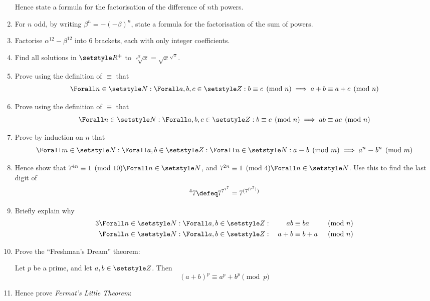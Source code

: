 \begin{enumerate}
  Hence state a formula for the factorisation of the difference of \(n\)th
  powers.
 \item
  For \(n\) odd, by writing \(\beta^n = -(-\beta)^n\), state a formula for the
  factorisation of the sum of powers.
 \item
  Factorise \(\alpha^{12} - \beta^{12}\) into 6 brackets, each with only integer
  coefficients.
 \item
  Find all solutions in \(\Reals^+\) to
  \(\sqrt[\sqrt x]x = {\sqrt x}^{\sqrt x}\).
 \item
  Prove using the definition of \(\equiv\) that
  \begin{equation*}
   \Forall n \in \Naturals :
   \Forall a, b, c \in \Integers :
   b \equiv c \pmod n \implies
   a + b \equiv a + c \pmod n
  \end{equation*}
 \item
  Prove using the definition of \(\equiv\) that
  \begin{equation*}
   \Forall n \in \Naturals :
   \Forall a, b, c \in \Integers :
   b \equiv c \pmod n \implies
   ab \equiv ac \pmod n
  \end{equation*}
 \item
  Prove by induction on \(n\) that
  \begin{equation*}
    \Forall m \in \Naturals :
    \Forall a, b \in \Integers :
    \Forall n \in \Naturals :
    a \equiv b \pmod m \implies
    a^n \equiv b^n \pmod m
  \end{equation*}
 \item
  Hence show that \(7^{4n} \equiv 1 \pmod{10} \Forall n \in \Naturals\), and
  \(7^{2n} \equiv 1 \pmod 4 \Forall n \in \Naturals\). Use
  this to find the last digit of
  \begin{equation*}
   {}^4 7 \defeq 7^{7^{7^7}} = 7^{(7^{(7^7)})}
  \end{equation*}
 \item
  Briefly explain why
  \begin{alignat*}3
   \Forall n \in \Naturals :
   \Forall a, b \in \Integers &:{}
   &ab&\equiv ba &&\pmod n \\
   \Forall n \in \Naturals :
   \Forall a, b \in \Integers &:{}
   &a + b&\equiv b + a &&\pmod n
  \end{alignat*}
 \item
  Prove the ``Freshman's Dream'' theorem:

  Let \(p\) be a prime, and let \(a, b \in \Integers\). Then
  \begin{equation*}
   (a + b)^p \equiv a^p + b^p \pmod p
  \end{equation*}
 \item
  Hence prove \emph{Fermat's Little Theorem}:


\end{enumerate}
